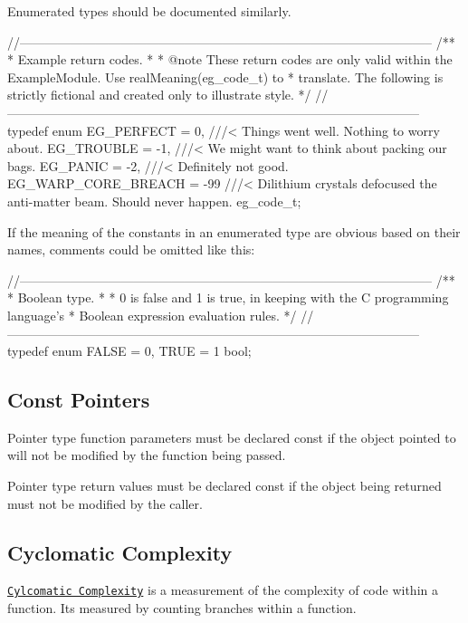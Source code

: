 Enumerated types should be documented similarly.

\begin{DoxyVerb}//--------------------------------------------------------------------------------------------------
/**
 * Example return codes.
 *
 * @note These return codes are only valid within the ExampleModule. Use realMeaning(eg_code_t) to
 *       translate. The following is strictly fictional and created only to illustrate style.
 */
//--------------------------------------------------------------------------------------------------
typedef enum
{
    EG_PERFECT = 0,             ///< Things went well. Nothing to worry about.
    EG_TROUBLE = -1,            ///< We might want to think about packing our bags.
    EG_PANIC = -2,              ///< Definitely not good.
    EG_WARP_CORE_BREACH = -99   ///< Dilithium crystals defocused the anti-matter beam. Should never happen.
}
eg_code_t;
\end{DoxyVerb}


If the meaning of the constants in an enumerated type are obvious based on their names, comments could be omitted like this\+:

\begin{DoxyVerb}//--------------------------------------------------------------------------------------------------
/**
 * Boolean type.
 *
 * 0 is false and 1 is true, in keeping with the C programming language's
 * Boolean expression evaluation rules.
 */
//--------------------------------------------------------------------------------------------------
typedef enum
{
    FALSE = 0,
    TRUE = 1
}
bool;
\end{DoxyVerb}
\hypertarget{ccoding_stds_main_cstdsConstPointers}{}\subsection{Const Pointers}\label{ccoding_stds_main_cstdsConstPointers}
Pointer type function parameters must be declared {\ttfamily const} if the object pointed to will not be modified by the function being passed.

Pointer type return values must be declared {\ttfamily const} if the object being returned must not be modified by the caller.\hypertarget{ccoding_stds_main_cstdsCyclomatic}{}\subsection{Cyclomatic Complexity}\label{ccoding_stds_main_cstdsCyclomatic}
\href{http://en.wikipedia.org/wiki/Cyclomatic_complexity}{\tt Cylcomatic Complexity} is a measurement of the complexity of code within a function. It\textquotesingle{}s measured by counting branches within a function.

